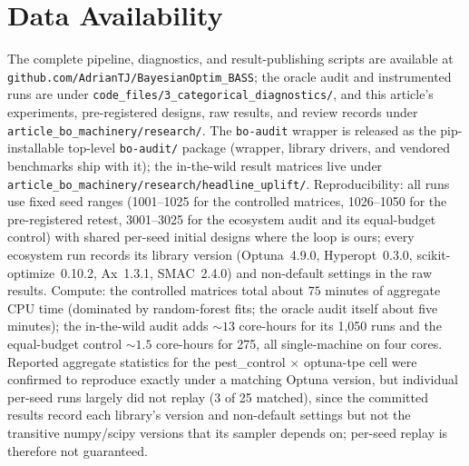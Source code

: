 \documentclass[%
 aip,
 amsmath,amssymb,
 floatfix,
 reprint,%
]{revtex4-1}
\begin{document}
\section*{Data Availability}
The complete pipeline, diagnostics, and result-publishing scripts are
available at \texttt{github.com/AdrianTJ/BayesianOptim\_BASS}; the oracle
audit and instrumented runs are under
\texttt{code\_files/3\_categorical\_diagnostics/}, and this article's
experiments, pre-registered designs, raw results, and review records
under \texttt{article\_bo\_machinery/research/}. The \texttt{bo-audit}
wrapper is released as the pip-installable top-level \texttt{bo-audit/}
package (wrapper, library drivers, and vendored benchmarks ship with it);
the in-the-wild result matrices live under
\texttt{article\_bo\_machinery/research/headline\_uplift/}. Reproducibility: all runs use fixed
seed ranges (1001--1025 for the controlled matrices, 1026--1050 for the
pre-registered retest, 3001--3025 for the ecosystem audit and its
equal-budget control) with shared per-seed initial designs where the
loop is ours; every ecosystem run records its library version
(Optuna~4.9.0, Hyperopt~0.3.0, scikit-optimize~0.10.2, Ax~1.3.1,
SMAC~2.4.0) and non-default settings in the raw results. Compute:
the controlled matrices total about $75$ minutes of aggregate CPU time
(dominated by random-forest fits; the oracle audit itself about five
minutes); the in-the-wild audit adds ${\sim}13$ core-hours for its
1{,}050 runs and the equal-budget control ${\sim}1.5$ core-hours for
275, all single-machine on four cores. Reported aggregate statistics for
the pest\_control $\times$ optuna-tpe cell were confirmed to reproduce
exactly under a matching Optuna version, but individual per-seed runs
largely did not replay (3 of 25 matched), since the committed results
record each library's version and
non-default settings but not the transitive numpy/scipy versions that its
sampler depends on; per-seed replay is therefore not guaranteed.


\end{document}
